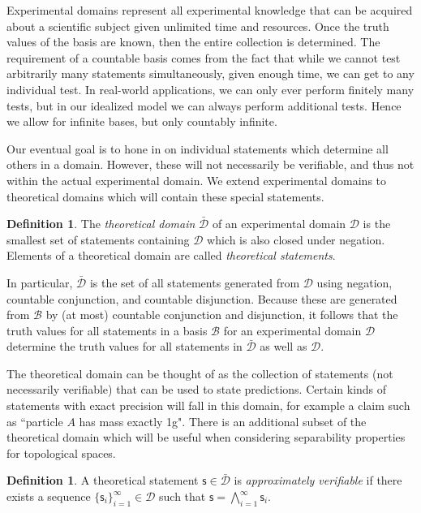 \documentclass[psamsfonts]{amsart}
\theoremstyle{definition}
\newtheorem{defn}[thm]{Definition}
\theoremstyle{remark}
\numberwithin{equation}{section}
\def\bigAND{\bigwedge}
\newcommand{\stmt}[1][s] {\mathsf{#1}}
\newcommand{\obs}[1][s] {\mathsf{#1}}
\newcommand{\edomain}[1][D] {\mathcal{#1}}
\newcommand{\tdomain}[1][D] {\bar{\mathcal{#1}}}
\newcommand{\basis}[1][B] {\mathcal{#1}} %
\begin{document}
Experimental domains represent all experimental knowledge that can be acquired about a scientific subject given unlimited time and resources. Once the truth values of the basis are known, then the entire collection is determined. The requirement of a countable basis comes from the fact that while we cannot test arbitrarily many statements simultaneously, given enough time, we can get to any individual test. In real-world applications, we can only ever perform finitely many tests, but in our idealized model we can always perform additional tests. Hence we allow for infinite bases, but only countably infinite. 

Our eventual goal is to hone in on individual statements which determine all others in a domain. However, these will not necessarily be verifiable, and thus not within the actual experimental domain. We extend experimental domains to theoretical domains which will contain these special statements. 

\begin{defn}
The \emph{theoretical domain} $\tdomain$ of an experimental domain $\edomain$ is the smallest set of statements containing $\edomain$ which is also closed under negation. Elements of a theoretical domain are called \emph{theoretical statements}.
\end{defn}

In particular, $\tdomain$ is the set of all statements generated from $\edomain$ using negation, countable conjunction, and countable disjunction. Because these are generated from $\basis$ by (at most) countable conjunction and disjunction, it follows that the truth values for all statements in a basis $\basis$ for an experimental domain $\edomain$ determine the truth values for all statements in $\tdomain$ as well as $\edomain$. 

The theoretical domain can be thought of as the collection of statements (not necessarily verifiable) that can be used to state predictions. Certain kinds of statements with exact precision will fall in this domain, for example a claim such as ``particle $A$ has mass exactly 1g". There is an additional subset of the theoretical domain which will be useful when considering separability properties for topological spaces. 

\begin{defn}\label{approx_verifiable}
A theoretical statement $\stmt\in\tdomain$ is \emph{approximately verifiable} if there exists a sequence $\{\obs_i\}_{i=1}^{\infty} \in \edomain$ such that $\stmt = \bigAND\limits_{i=1}^{\infty} \obs_i$.
\end{defn}
\end{document}
